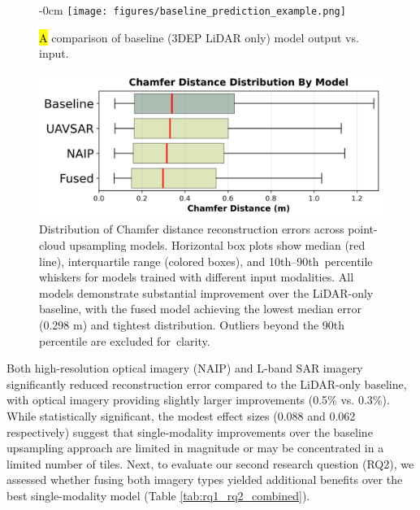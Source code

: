 \documentclass[remotesensing,article,accept,pdftex,moreauthors]{Definitions/mdpi}
\begin{document}
\begin{figure}[H]

\begin{adjustwidth}{-\extralength}{0cm}
\centering %
\texttt{[image: figures/baseline\_prediction\_example.png]}
\end{adjustwidth}
    \caption{\hl{A} %
 comparison of baseline (3DEP LiDAR only) model output vs. input.}
    \label{fig:baseline_pt_cloud_example}
\end{figure}


\vspace{-10pt}

\begin{figure}[H]
    \includegraphics[width=0.75\linewidth]{figures/boxplot_by_model.png}
    \caption{Distribution of Chamfer distance reconstruction errors across point-cloud upsampling models. Horizontal box plots show median (red line), interquartile range (colored boxes), and \mbox{10th--90th percentile} whiskers for models trained with different input modalities. All models demonstrate substantial improvement over the LiDAR-only baseline, with the fused model achieving the lowest median error (0.298 m) and tightest distribution. Outliers beyond the 90th percentile are excluded \mbox{for clarity}.}
    \label{fig:boxplot_model_comparison}
\end{figure}



Both high-resolution optical imagery (NAIP) and L-band SAR imagery significantly reduced reconstruction error compared to the LiDAR-only baseline, with optical imagery providing slightly larger improvements (0.5\% vs. 0.3\%). While statistically significant, the modest effect sizes (0.088 and 0.062 respectively) suggest that single-modality improvements over the baseline upsampling approach are limited in magnitude or may be concentrated in a limited number of tiles. Next, to evaluate our second research question (RQ2), we assessed whether fusing both imagery types yielded additional benefits over the best single-modality model (Table \ref{tab:rq1_rq2_combined}).
\end{document}
